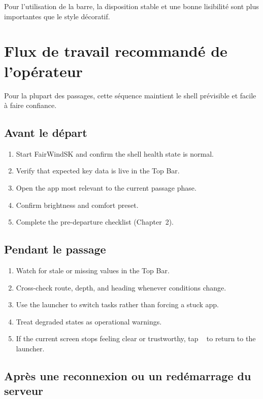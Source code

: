 Pour l'utilisation de la barre, la disposition stable et une bonne lisibilité sont plus importantes que le style décoratif.

\chapter{Flux de travail recommandé de l'opérateur}
\label{ch:workflow}

Pour la plupart des passages, cette séquence maintient le shell prévisible et facile à faire confiance.

\section{Avant le départ}

\begin{enumerate}
  \item Start FairWindSK and confirm the shell health state is normal.
  \item Verify that expected key data is live in the Top Bar.
  \item Open the app most relevant to the current passage phase.
  \item Confirm brightness and comfort preset.
  \item Complete the pre-departure checklist (Chapter~2).
\end{enumerate}

\section{Pendant le passage}

\begin{enumerate}
  \item Watch for stale or missing values in the Top Bar.
  \item Cross-check route, depth, and heading whenever conditions change.
  \item Use the launcher to switch tasks rather than forcing a stuck app.
  \item Treat degraded states as operational warnings.
  \item If the current screen stops feeling clear or trustworthy, tap
        ~ to return to the launcher.
\end{enumerate}

\section{Après une reconnexion ou un redémarrage du serveur}

